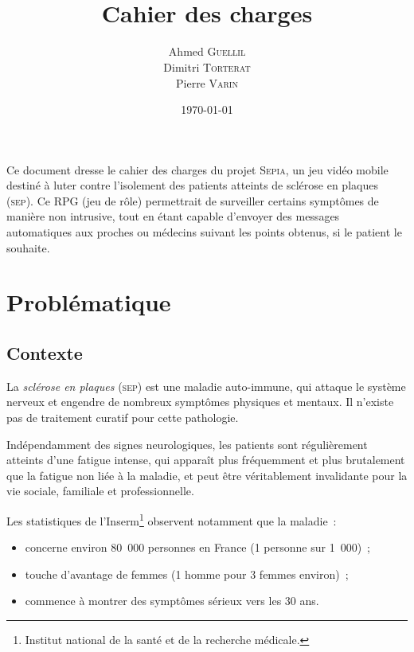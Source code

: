 \documentclass[a4paper,12pt,francais]{article}
\title{\Sepia\\Cahier des charges}
\author{Ahmed \textsc{Guellil}\\
    Dimitri \textsc{Torterat}\\
    Pierre \textsc{Varin}
}
\date{\today} %
\newcommand{\SEP}{\textsc{sep}\xspace}
\newcommand{\Sepia}{\textsc{Sepia}\xspace}
\begin{document}
\renewcommand{\labelitemi}{-}
\renewcommand{\labelitemii}{\tiny{+}}
\renewcommand{\contentsname}{Sommaire}

\maketitle

Ce document dresse le cahier des charges du projet \Sepia, un jeu vidéo mobile destiné à luter contre l’isolement des patients atteints de sclérose en plaques (\SEP). Ce RPG (jeu de rôle) permettrait de surveiller certains symptômes de manière non intrusive, tout en étant capable d’envoyer des messages automatiques aux proches ou médecins suivant les points obtenus, si le patient le souhaite.


\newpage
\tableofcontents
\newpage

\section{Problématique}
\subsection{Contexte}

La \emph{sclérose en plaques} (\SEP{}) est une maladie auto-immune, qui attaque le système nerveux et engendre de nombreux symptômes physiques et mentaux. Il n’existe pas de traitement curatif pour cette pathologie.

Indépendamment des signes neurologiques, les patients sont régulièrement atteints d’une fatigue intense, qui apparaît plus fréquemment et plus brutalement que la fatigue non liée à la maladie, et peut être véritablement invalidante pour la vie sociale, familiale et professionnelle.

Les statistiques de l’Inserm\footnote{Institut national de la santé et de la recherche médicale.} observent notamment que la maladie~:
\begin{itemize}
\item concerne environ 80~000 personnes en France (1 personne sur 1~000)~;
\item touche d’avantage de femmes (1 homme pour 3 femmes environ)~;
\item commence à montrer des symptômes sérieux vers les 30 ans.
\end{itemize}
\end{document}

